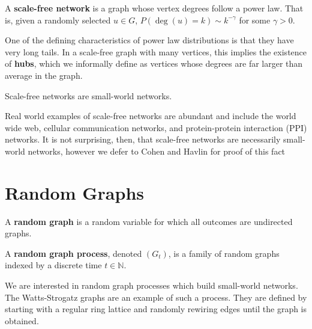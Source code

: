 
\begin{definition}
  A \textbf{scale-free network} is a graph whose vertex degrees follow a power
  law. That is, given a randomly selected $u \in G$,
  $P(\deg(u) = k) \sim k^{-\gamma}$ for some $\gamma > 0$.
\end{definition}

One of the defining characteristics of power law distributions is that they have
very long tails. In a scale-free graph with many vertices, this implies the
existence of \textbf{hubs}, which we informally define as vertices whose degrees
are far larger than average in the graph.

\begin{theorem}
  Scale-free networks are small-world networks.
\end{theorem}

Real world examples of scale-free networks are abundant and include the world
wide web, cellular communication networks, and protein-protein interaction (PPI)
networks. It is not surprising, then, that scale-free networks are necessarily
small-world networks, however we defer to Cohen and Havlin for proof of this
fact 


\section{Random Graphs}


\begin{definition}
  A \textbf{random graph} is a random variable for which all outcomes are
  undirected graphs.

  A \textbf{random graph process}, denoted $(G_t)$, is a family of random graphs
  indexed by a discrete time $t \in \mathbb{N}$.
\end{definition}

We are interested in random graph processes which build small-world networks.
The Watts-Strogatz graphs are an example of such a process. They are defined by
starting with a regular ring lattice and randomly rewiring edges until the graph
is obtained.

